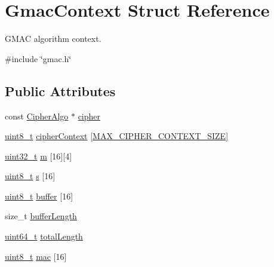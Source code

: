 \hypertarget{structGmacContext}{}\section{Gmac\+Context Struct Reference}
\label{structGmacContext}


G\+M\+AC algorithm context.  




{\ttfamily \#include \char`\"{}gmac.\+h\char`\"{}}

\subsection*{Public Attributes}
\begin{DoxyCompactItemize}
\item 
const \hyperlink{structCipherAlgo}{Cipher\+Algo} $\ast$ \hyperlink{structGmacContext_a1fd83571a16fb7cf5ab884599319839e}{cipher}
\item 
\hyperlink{stdint_8h_aba7bc1797add20fe3efdf37ced1182c5}{uint8\+\_\+t} \hyperlink{structGmacContext_a5e191ffa77ad12e87ef45bf73d63fd9c}{cipher\+Context} \mbox{[}\hyperlink{cyclone__crypto_2core_2crypto_8h_a99fb8f5b5cc906fd435df00c1720f7ad}{M\+A\+X\+\_\+\+C\+I\+P\+H\+E\+R\+\_\+\+C\+O\+N\+T\+E\+X\+T\+\_\+\+S\+I\+ZE}\mbox{]}
\item 
\hyperlink{stdint_8h_a435d1572bf3f880d55459d9805097f62}{uint32\+\_\+t} \hyperlink{structGmacContext_aee713037ed85ba9ec892d297044a1d1a}{m} \mbox{[}16\mbox{]}\mbox{[}4\mbox{]}
\item 
\hyperlink{stdint_8h_aba7bc1797add20fe3efdf37ced1182c5}{uint8\+\_\+t} \hyperlink{structGmacContext_aba6a64b74fb0cf05d78d759257ab8c2b}{s} \mbox{[}16\mbox{]}
\item 
\hyperlink{stdint_8h_aba7bc1797add20fe3efdf37ced1182c5}{uint8\+\_\+t} \hyperlink{structGmacContext_ac0106d4b7496e620f9d6f354345bac2c}{buffer} \mbox{[}16\mbox{]}
\item 
size\+\_\+t \hyperlink{structGmacContext_a751b0d43545dad89b8714d3584514ede}{buffer\+Length}
\item 
\hyperlink{stdint_8h_aec6fcb673ff035718c238c8c9d544c47}{uint64\+\_\+t} \hyperlink{structGmacContext_aefe7162a28878d28b4298b87d1e69922}{total\+Length}
\item 
\hyperlink{stdint_8h_aba7bc1797add20fe3efdf37ced1182c5}{uint8\+\_\+t} \hyperlink{structGmacContext_adfb28cc9aa3f86ca3b0d2a294a5eeaf1}{mac} \mbox{[}16\mbox{]}
\end{DoxyCompactItemize}


